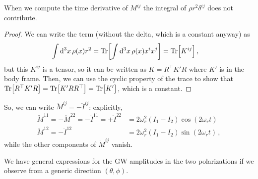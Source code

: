 \documentclass[main.tex]{subfiles}
\begin{document}
\begin{claim}
When we compute the time derivative of \(M^{ij}\) the integral of \(\rho r^2 \delta^{ij}\) does not contribute.
\end{claim}

\begin{proof}
We can write the term (without the delta, which is a constant anyway) as 
%
\begin{align}
\int \dd[3]{x} \rho (x) r^2  &=
\Tr[ \int \dd[3]{x} \rho (x) x^{i}x^{j}] = \Tr[K^{ij}]
\,,
\end{align}
%
but this \(K^{ij}\) is a tensor, so it can be written as \(K = R^{\top} K' R\) where \(K'\) is in the body frame. 
Then, we can use the cyclic property of the trace to show that \(\Tr[R^{\top} K' R] = \Tr[K' R R^{\top}] = \Tr[K']\), which is a constant.
\end{proof}

So, we can write \(\ddot{M}^{ij} = - \ddot{I}^{ij}\): explicitly, 
%
\begin{align}
\ddot{M}^{11}= - \ddot{M}^{22} = - \ddot{I}^{11} = + \ddot{I}^{22} 
&= 2 \omega_{r}^2 (I_1 - I_2 ) \cos(2 \omega_{r} t)   \\
\ddot{M}^{12} = - \ddot{I}^{12} 
&= 2 \omega_{r}^2 (I_1 - I_2 ) \sin(2 \omega_{r} t)
\,,
\end{align}
%
while the other components of \(\ddot{M}^{ij}\) vanish. 

We have general expressions for the GW amplitudes in the two polarizations if we observe from a generic direction \((\theta, \phi )\). 
\end{document}
